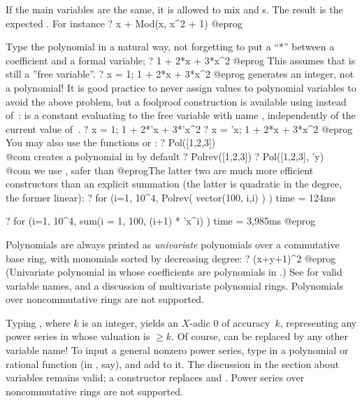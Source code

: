 If the main variables are the same, it is allowed to mix  and
s. The result is the expected . For instance
\bprog
    ? x + Mod(x, x^2 + 1)
@eprog

%
\label{se:pol}
Type the polynomial in a natural way, not forgetting to put a ``$*$'' between
a coefficient and a formal variable;
\bprog
? 1 + 2*x + 3*x^2
@eprog\noindent
This assumes that  is still a ''free variable''.
\bprog
? x = 1; 1 + 2*x + 3*x^2
@eprog\noindent
generates an integer, not a polynomial! It is good practice to never assign
values to polynomial variables to avoid the above problem, but a foolproof
construction is available using  instead of~: 
is a constant evaluating to the free variable with name ,
independently of the current value of~.
\bprog
? x = 1; 1 + 2*'x + 3*'x^2
? x = 'x; 1 + 2*x + 3*x^2
@eprog\noindent
You may also use the functions  or :
\bprog
? Pol([1,2,3])       \\@com {} creates a polynomial in  by default
? Polrev([1,2,3])
? Pol([1,2,3], 'y)   \\@com we use , safer than 
@eprog\noindent The latter two are much more efficient constructors than an
explicit summation (the latter is quadratic in the degree, the former linear):
\bprog
? for (i=1, 10^4, Polrev( vector(100, i,i) ) )
time = 124ms

? for (i=1, 10^4, sum(i = 1, 100, (i+1) * 'x^i) )
time = 3,985ms
@eprog

Polynomials are always printed as \emph{univariate} polynomials over a
commutative base ring, with monomials sorted by decreasing degree:
\bprog
? (x+y+1)^2
@eprog\noindent
(Univariate polynomial in  whose coefficients are polynomials in
.) See  for valid variable names, and a discussion
of multivariate polynomial rings. Polynomials over noncommutative rings
are not supported.

%
\label{se:series}
Typing , where $k$ is an integer, yields an $X$-adic $0$ of
accuracy~$k$, representing any power series in  whose valuation is
$\geq k$. Of course,  can be replaced by any other variable name! To
input a general nonzero power series, type in a polynomial or rational
function (in , say), and add  to it. The discussion
in the  section about variables remains valid; a constructor
 replaces  and . Power series over
noncommutative rings are not supported.

